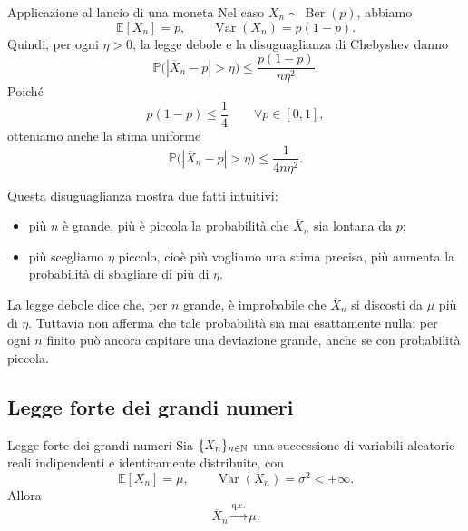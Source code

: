 \documentclass[a4paper]{article}
\begin{document}
\begin{snippetexample}{Applicazione al lancio di una moneta}
    Nel caso \(X_n\sim\operatorname{Ber}(p)\), abbiamo
    \[
        \mathbb{E}[X_n]=p,
        \qquad
        \operatorname{Var}(X_n)=p(1-p).
    \]
    Quindi, per ogni \(\eta>0\), la legge debole e la disuguaglianza di Chebyshev danno
    \[
        \mathbb{P}\bigl(|\overline{X}_n-p|>\eta\bigr)
        \leq
        \frac{p(1-p)}{n\eta^2}.
    \]
    Poiché
    \[
        p(1-p)\leq \frac14
        \qquad
        \forall p\in[0,1],
    \]
    otteniamo anche la stima uniforme
    \[
        \mathbb{P}\bigl(|\overline{X}_n-p|>\eta\bigr)
        \leq
        \frac1{4n\eta^2}.
    \]

    Questa disuguaglianza mostra due fatti intuitivi:
    \begin{itemize}
        \item più \(n\) è grande, più è piccola la probabilità che \(\overline{X}_n\) sia lontana da \(p\);
        \item più scegliamo \(\eta\) piccolo, cioè più vogliamo una stima precisa, più aumenta la probabilità di sbagliare di più di \(\eta\).
    \end{itemize}
\end{snippetexample}

La legge debole dice che, per \(n\) grande, è improbabile che \(\overline{X}_n\) si discosti da \(\mu\) più di \(\eta\). Tuttavia non afferma che tale probabilità sia mai esattamente nulla: per ogni \(n\) finito può ancora capitare una deviazione grande, anche se con probabilità piccola.

\subsection{Legge forte dei grandi numeri}

\begin{snippettheorem}{Legge forte dei grandi numeri}
    Sia \(\{X_n\}_{n\in\mathbb{N}}\) una successione di variabili aleatorie reali indipendenti e identicamente distribuite, con
    \[
        \mathbb{E}[X_n]=\mu,
        \qquad
        \operatorname{Var}(X_n)=\sigma^2<+\infty.
    \]
    Allora
    \[
        \overline{X}_n\xrightarrow{\text{q.c.}}\mu.
    \]
\end{snippettheorem}
\end{document}
